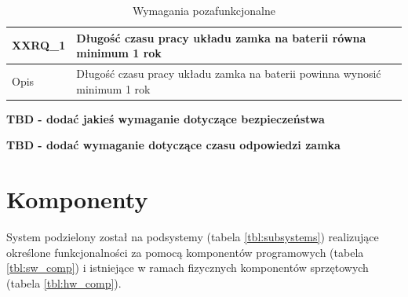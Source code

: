         \begin{table}[h!]
            \caption{Wymagania pozafunkcjonalne}
            \centering
            \begin{subtable}[c]{\textwidth}
                \centering
                \begin{tabular}{|p{2cm}|p{12cm}|}
                    \hline XXRQ\_1      & \textbf{Długość czasu pracy układu zamka na baterii równa minimum 1 rok}  \\
                    \hline \cellcolor[gray]{0.8} Opis         & Długość czasu pracy układu zamka na baterii powinna wynosić minimum 1 rok \\
                    \hline
                \end{tabular}
                \label{tbl:xxrq1}    
            \end{subtable}
            \label{tbl:xxrq}
        \end{table}

        \textbf{TBD - dodać jakieś wymaganie dotyczące bezpieczeństwa}

        \textbf{TBD - dodać wymaganie dotyczące czasu odpowiedzi zamka}

        \section{Komponenty}

            System podzielony został na podsystemy (tabela \ref{tbl:subsystems}) realizujące określone funkcjonalności za pomocą komponentów programowych (tabela \ref{tbl:sw_comp}) i istniejące w ramach fizycznych komponentów sprzętowych (tabela \ref{tbl:hw_comp}).

